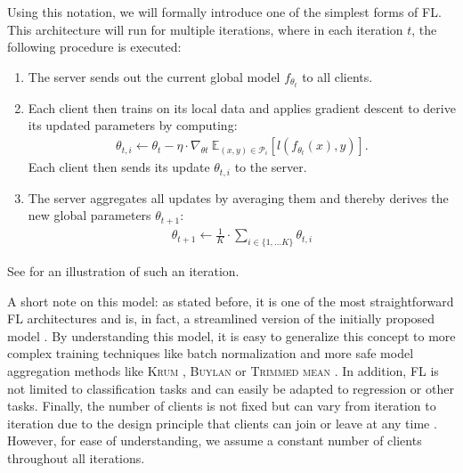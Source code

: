 \documentclass[conference]{IEEEtran}
\begin{document}
Using this notation, we will formally introduce one of the simplest forms of FL. This architecture will run for multiple iterations, where in each iteration $t$, the following procedure is executed:
\begin{enumerate}
    \item The server sends out the current global model $f_{\theta_t}$ to all clients.
    \item Each client then trains on its local data and applies gradient descent to derive its updated parameters by computing:
    \begin{align}
        \theta_{t,i} \leftarrow \theta_{t} - \eta \cdot \nabla_{\theta t} \  \mathbb{E}_{(x,y)\in \mathcal{P}_i}[l(f_{\theta_t}(x), y)]. \label{math:update_calc}
    \end{align}
    Each client then sends its update $\theta_{t,i}$ to the server.
    \item The server aggregates all updates by averaging them and thereby derives the new global parameters $\theta_{t+1}$: 
    \begin{align}
        \theta_{t+1} \leftarrow \frac{1}{K} \cdot \sum\limits_{i \in \{1, \ldots K\}} \theta_{t,i} \label{math:aggregation_example}
    \end{align}
\end{enumerate}
See  for an illustration of such an iteration.

A short note on this model: as stated before, it is one of the most straightforward FL architectures and is, in fact, a streamlined version of the initially proposed model \cite{McMahan2017}. By understanding this model, it is easy to generalize this concept to more complex training techniques like batch normalization \cite{Ioffe2015} and more safe model aggregation methods like \textsc{Krum} \cite{Blanchard2017}, \textsc{Buylan} \cite{Mhamdi2018} or \textsc{Trimmed mean} \cite{Yin2018}. In addition, FL is not limited to classification tasks and can easily be adapted to regression or other tasks. Finally, the number of clients is not fixed but can vary from iteration to iteration due to the design principle that clients can join or leave at any time \cite{McMahan2017}. However, for ease of understanding, we assume a constant number of clients throughout all iterations.
\end{document}
